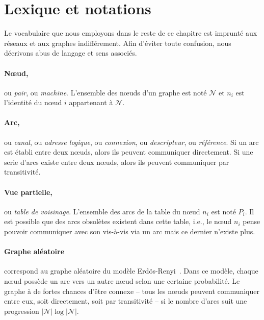 
\section{Lexique et notations}
\label{net:sec:lexique}

Le vocabulaire que nous employons dans le reste de ce chapitre est imprunté aux
réseaux et aux graphes indifférement. Afin d'éviter toute confusion, nous
décrivons abus de langage et sens associés.


\paragraph{Nœud,} ou \emph{pair}, ou \emph{machine}. L'ensemble des nœuds d'un
graphe est noté $\mathcal{N}$ et $n_i$ est l'identité du nœud $i$ appartenant à
$\mathcal{N}$.

\paragraph{Arc,} ou \emph{canal}, ou \emph{adresse logique}, ou
\emph{connexion}, ou \emph{descripteur}, ou \emph{référence}. Si un arc est
établi entre deux nœuds, alors ils peuvent communiquer directement. Si une serie
d'arcs existe entre deux nœuds, alors ils peuvent communiquer par transitivité.

\paragraph{Vue partielle,} ou \emph{table de voisinage}. L'ensemble des arcs de
la table du nœud $n_i$ est noté $P_i$. Il est possible que des arcs obsolètes
existent dans cette table, i.e., le nœud $n_i$ pense pouvoir communiquer avec
son vis-à-vis via un arc mais ce dernier n'existe plus.

\paragraph{Graphe aléatoire} correspond au graphe aléatoire du modèle
Erdös-Renyi~\cite{erdos1959random}. Dans ce modèle, chaque nœud possède un arc
vers un autre nœud selon une certaine probabilité. Le graphe à de fortes chances
d'être connexe -- tous les nœuds peuvent communiquer entre eux, soit
directement, soit par transitivité -- si le nombre d'arcs suit une progression
$|\mathcal{N}|\log |\mathcal{N}|$.


